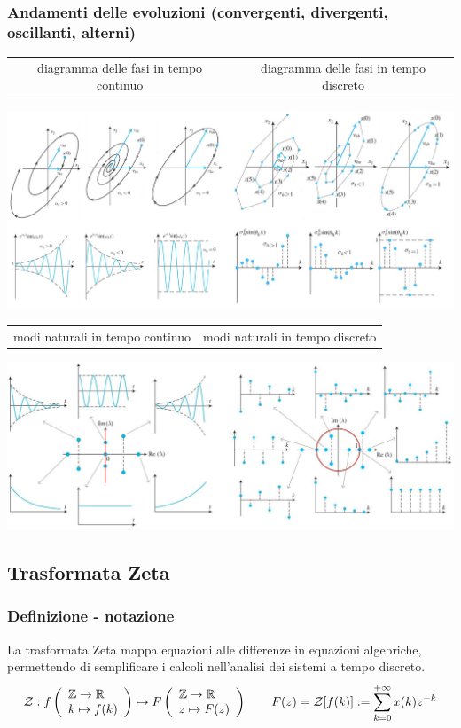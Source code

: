 \subsubsection*{Andamenti delle evoluzioni (convergenti, divergenti, oscillanti, alterni)}
\begin{center}
	\begin{tabularx}{\textwidth}{C C}
		\midrule
		diagramma delle fasi in tempo continuo & diagramma delle fasi in tempo discreto
	\end{tabularx}
	\includegraphics[width=\textwidth]{immagini/tempo discreto 1.png}
	\vspace{10pt}

	\begin{tabularx}{\textwidth}{C C}
		\midrule
		modi naturali in tempo continuo & modi naturali in tempo discreto
	\end{tabularx}
	\includegraphics[width=\textwidth]{immagini/tempo discreto 2.png}
\end{center}

\subsection{Trasformata Zeta}
\subsubsection*{Definizione - notazione}
La trasformata Zeta mappa equazioni alle differenze in equazioni algebriche, permettendo di semplificare i calcoli nell'analisi dei
sistemi a tempo discreto.
\[\mathcal{Z} : f \left(\begin{array}{l} \mathbb{Z} \to \mathbb{R} \\ k \mapsto f(k) \end{array}\right) \mapsto F \left(\begin{array}{l} \mathbb{Z} \to \mathbb{R} \\ z \mapsto F(z) \end{array}\right) \qquad F(z) = \mathcal{Z}[f(k)] := \sum_{k=0}^{+\infty} x(k) z^{-k}\]

